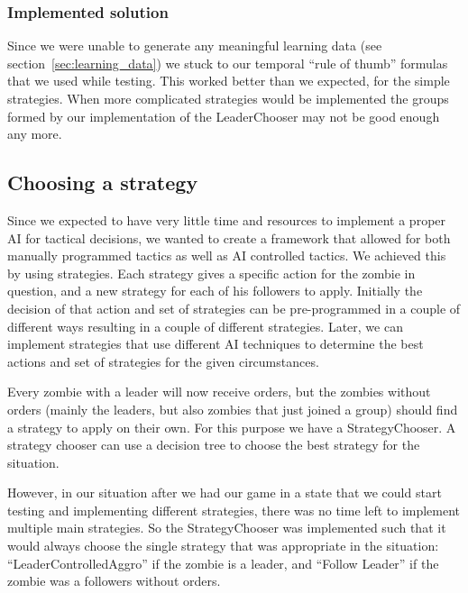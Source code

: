 \subsubsection{Implemented solution}
Since we were unable to generate any meaningful learning data (see section~\ref{sec:learning_data}) we stuck to our temporal ``rule of thumb'' formulas that we used while testing. This worked better than we expected, for the simple strategies. When more complicated strategies would be implemented the groups formed by our implementation of the LeaderChooser may not be good enough any more.

\subsection{Choosing a strategy}
Since we expected to have very little time and resources to implement a proper AI for tactical decisions, we wanted to create a framework that allowed for both manually programmed tactics as well as AI controlled tactics. We achieved this by using strategies. Each strategy gives a specific action for the zombie in question, and a new strategy for each of his followers to apply. Initially the decision of that action and set of strategies can be pre-programmed in a couple of different ways resulting in a couple of different strategies. Later, we can implement strategies that use different AI techniques to determine the best actions and set of strategies for the given circumstances.

Every zombie with a leader will now receive orders, but the zombies without orders (mainly the leaders, but also zombies that just joined a group) should find a strategy to apply on their own. For this purpose we have a StrategyChooser. A strategy chooser can use a decision tree to choose the best strategy for the situation.

However, in our situation after we had our game in a state that we could start testing and implementing different strategies, there was no time left to implement multiple main strategies. So the StrategyChooser was implemented such that it would always choose the single strategy that was appropriate in the situation: ``LeaderControlledAggro'' if the zombie is a leader, and ``Follow Leader'' if the zombie was a followers without orders.

